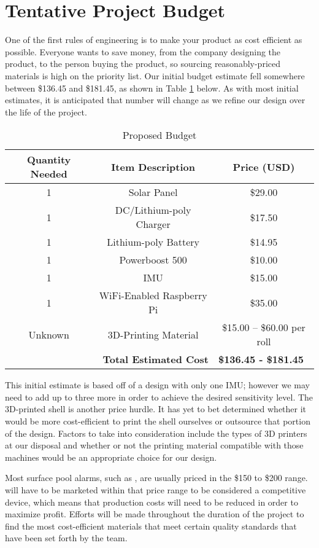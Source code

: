 \section{Tentative Project Budget}


One of the first rules of engineering is to make your product as cost efficient as possible. Everyone wants to save money, from the company designing the product, to the person buying the product, so sourcing reasonably-priced materials is high on the priority list. Our initial budget estimate fell somewhere between \$136.45 and \$181.45, as shown in Table \ref{tab:budget} below. As with most initial estimates, it is anticipated that number will change as we refine our design over the life of the project.\hfill

\begin{table}[H]
\spiceitup
\caption{Proposed Budget}
\begin{tabular}{c|c|c}
Quantity Needed & Item Description & Price (USD) \\ \hline
1 & Solar Panel & \$29.00 \\
1 & DC/Lithium-poly Charger & \$17.50 \\
1 & Lithium-poly Battery & \$14.95 \\
1 & Powerboost 500 & \$10.00 \\
1 & IMU & \$15.00 \\
1 & WiFi-Enabled Raspberry Pi & \$35.00 \\
Unknown & 3D-Printing Material & \$15.00 – \$60.00 per roll \\
 & \multicolumn{1}{r|}{\textbf{Total Estimated Cost}} & \multicolumn{1}{l}{\textbf{\$136.45 - \$181.45}}
\end{tabular}
\centering
\label{tab:budget}
\end{table}

This initial estimate is based off of a design with only one IMU; however we may need to add up to three more in order to achieve the desired sensitivity level. The 3D-printed shell is another price hurdle. It has yet to bet determined whether it would be more cost-efficient to print the shell ourselves or outsource that portion of the design. Factors to take into consideration include the types of 3D printers at our disposal and whether or not the printing material compatible with those machines would be an appropriate choice for our design. 

Most surface pool alarms, such as \juicy, are usually priced in the \$150 to \$200 range. \juicy will have to be marketed within that price range to be considered a competitive device, which means that production costs will need to be reduced in order to maximize profit. Efforts will be made throughout the duration of the project to find the most cost-efficient materials that meet certain quality standards that have been set forth by the team.
